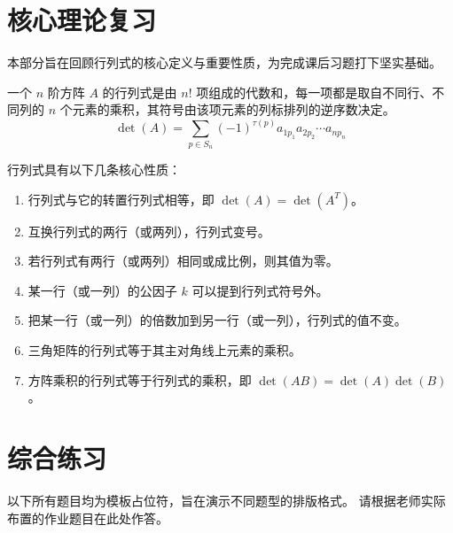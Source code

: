 \documentclass[a4paper, 12pt]{ctexart}
\begin{document}
\makeHomeworkTitle

\section{核心理论复习}

本部分旨在回顾行列式的核心定义与重要性质，为完成课后习题打下坚实基础。

\begin{definition}
    一个 $n$ 阶方阵 $A$ 的行列式是由 $n!$ 项组成的代数和，每一项都是取自不同行、不同列的 $n$ 个元素的乘积，其符号由该项元素的列标排列的逆序数决定。
    $$
    \det(A) = \sum_{p \in S_n} (-1)^{\tau(p)} a_{1p_1} a_{2p_2} \cdots a_{np_n}
    $$
\end{definition}

\begin{theorem}[行列式的性质]
    行列式具有以下几条核心性质：
    \begin{enumerate}
        \item 行列式与它的转置行列式相等，即 $\det(A) = \det(A^T)$。
        \item 互换行列式的两行（或两列），行列式变号。
        \item 若行列式有两行（或两列）相同或成比例，则其值为零。
        \item 某一行（或一列）的公因子 $k$ 可以提到行列式符号外。
        \item 把某一行（或一列）的倍数加到另一行（或一列），行列式的值不变。
        \item 三角矩阵的行列式等于其主对角线上元素的乘积。
        \item 方阵乘积的行列式等于行列式的乘积，即 $\det(AB) = \det(A)\det(B)$。
    \end{enumerate}
\end{theorem}

\vspace{1cm}

\section{综合练习}

\begin{tcolorbox}[hintstyle, title={\textbf{重要说明}}]
    以下所有题目均为模板占位符，旨在演示不同题型的排版格式。
    请根据老师实际布置的作业题目在此处作答。
\end{tcolorbox}
\end{document}
